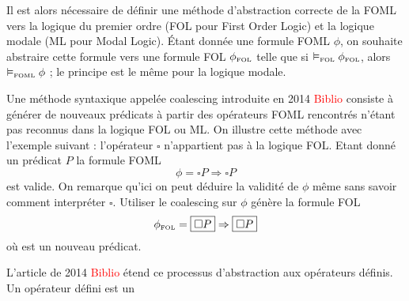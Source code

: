 \documentclass[12pt]{article}
\newcommand{\FOL}{\ensuremath{\textup{\tiny{}FOL}}}
\newcommand{\FOML}{\ensuremath{\textup{\tiny{}FOML}}}
\newcommand{\raph}[1]{\textcolor{red}{#1}}
\begin{document}
Il est alors nécessaire de définir une méthode d'abstraction correcte de la FOML vers la logique du premier ordre (FOL pour First Order Logic) et la logique modale (ML pour Modal Logic).
Étant donnée une formule FOML $\phi$, on souhaite abstraire cette formule vers une formule FOL $\phi_\FOL$ telle que si $\vDash_\FOL \phi_\FOL$, alors $\vDash_\FOML \phi$ ; le principe est le même pour la logique modale.

Une méthode syntaxique appelée \og{}coalescing\fg{} introduite en 2014 \raph{Biblio} consiste à générer de nouveaux prédicats à partir des opérateurs FOML rencontrés n'étant pas reconnus dans la logique FOL ou ML.
On illustre cette méthode avec l'exemple suivant : l'opérateur $\square$ n'appartient pas à la logique FOL.
Etant donné un prédicat $P$ la formule FOML
\[ \phi = \square P \Rightarrow \square P \]
est valide.
On remarque qu'ici on peut déduire la validité de $\phi$ même sans savoir comment interpréter $\square$.
Utiliser le coalescing sur $\phi$ génère la formule FOL
\[ \phi_\FOL = \fbox{$\square P$} \Rightarrow \fbox{$\square P$} \]
où  est un nouveau prédicat.

L'article de 2014 \raph{Biblio} étend ce processus d'abstraction aux opérateurs définis.
Un opérateur défini est un 
\end{document}
